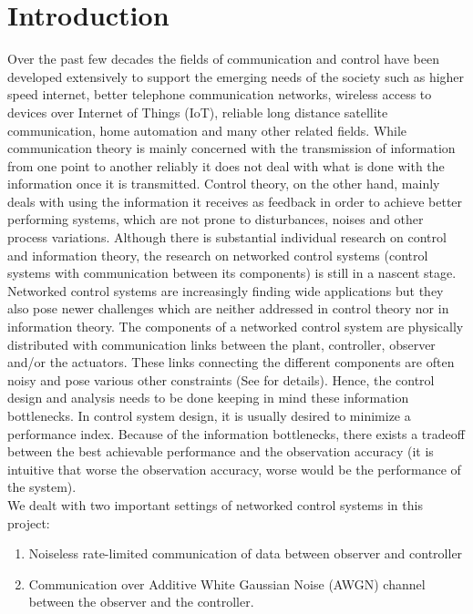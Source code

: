 \documentclass[12pt]{caltech_thesis_finalreport}
\begin{document}
\tableofcontents

\mainmatter

\chapter{Introduction}
\label{intro}
	Over the past few decades the fields of communication and control have been developed extensively to support the emerging needs of the society such as higher speed internet, better telephone communication networks, wireless access to devices over Internet of Things (IoT), reliable long distance satellite communication, home automation and many other related fields. While communication theory is mainly concerned with the transmission of information from one point to another reliably it does not deal with what is done with the information once it is transmitted. Control theory, on the other hand, mainly deals with using the information it receives as feedback in order to achieve better performing systems, which are not prone to disturbances, noises and other process variations. Although there is substantial individual research on control and information theory, the research on networked control systems (control systems with communication between its components) is still in a nascent stage.\\
Networked control systems are increasingly finding wide applications but they also pose newer challenges which are neither addressed in control theory nor in information theory. The components of a networked control system are physically distributed with communication links between the plant, controller, observer and/or the actuators. These links connecting the different components are often noisy and pose various other constraints (See \cite{constraints} for details). Hence, the control design and analysis needs to be done keeping in mind these information bottlenecks. In control system design, it is usually desired to minimize a performance index. Because of the information bottlenecks, there exists a tradeoff between the best achievable performance and the observation accuracy (it is intuitive that worse the observation accuracy, worse would be the performance of the system). \\
We dealt with two important settings of networked control systems in this project:
\begin{enumerate}
\item Noiseless rate-limited communication of data between observer and controller 
\item Communication over Additive White Gaussian Noise (AWGN) channel between the observer and the controller.
\end{enumerate} 
\end{document}
